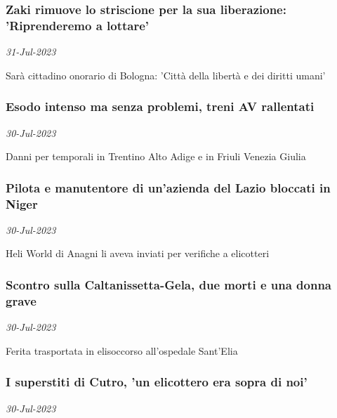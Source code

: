 \subsubsection{Zaki rimuove lo striscione per la sua liberazione: 'Riprenderemo a lottare' \href{https://www.ansa.it/sito/notizie/cronaca/2023/07/30/zaki-rimuove-lo-striscione-per-la-sua-liberazione-da-domani-riprendo-a-lottare_67e1cc4c-26c2-4115-8ff2-2381677438bd.html}{}}
\textit{31-Jul-2023}

Sar\`{a} cittadino onorario di Bologna: 'Citt\`{a} della libert\`{a} e dei diritti umani'
\subsubsection{Esodo intenso ma senza problemi, treni AV rallentati \href{https://www.ansa.it/sito/notizie/cronaca/2023/07/30/esodo-intenso-ma-senza-problemi-treni-av-rallentati_3d58d187-075f-40a5-a90f-30a6fa2c1eab.html}{}}
\textit{30-Jul-2023}

Danni per temporali in Trentino Alto Adige e in Friuli Venezia Giulia
\subsubsection{Pilota e manutentore di un'azienda del Lazio bloccati in Niger \href{https://www.ansa.it/sito/notizie/cronaca/2023/07/30/pilota-e-manutentore-di-unazienda-del-lazio-bloccati-in-niger_d8b6c968-9990-4e7c-80da-2cb5bbcf5c12.html}{}}
\textit{30-Jul-2023}

Heli World di Anagni li aveva inviati per verifiche a elicotteri
\subsubsection{Scontro sulla Caltanissetta-Gela, due morti e una donna grave \href{https://www.ansa.it/sito/notizie/cronaca/2023/07/30/scontro-sulla-caltanissetta-gela-due-morti-e-una-donna-grave_7870c4e0-1529-4677-8217-b3f6cb5d7ad6.html}{}}
\textit{30-Jul-2023}

Ferita trasportata in elisoccorso all'ospedale Sant'Elia
\subsubsection{I superstiti di Cutro, 'un elicottero era sopra di noi' \href{https://www.ansa.it/sito/notizie/cronaca/2023/07/30/i-superstiti-di-cutro-un-elicottero-era-sopra-di-noi-_d594b237-7e25-4ead-8e98-f7ce09d4b943.html}{}}
\textit{30-Jul-2023}

